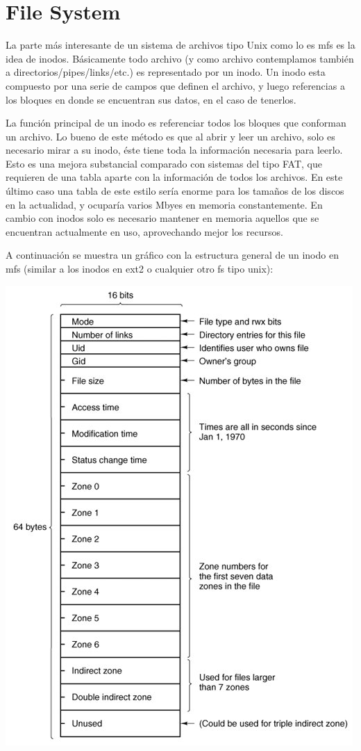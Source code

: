 \section{File System}

La parte más interesante de un sistema de archivos tipo Unix como lo es mfs es
la idea de inodos. Básicamente todo archivo (y como archivo contemplamos también
a directorios/pipes/links/etc.) es representado por un inodo. Un inodo esta
compuesto por una serie de campos que definen el archivo, y luego referencias a
los bloques en donde se encuentran sus datos, en el caso de tenerlos.

La función principal de un inodo es referenciar todos los bloques que conforman
un archivo. Lo bueno de este método es que al abrir y leer un archivo, solo es
necesario mirar a su inodo, éste tiene toda la información necesaria para
leerlo. Esto es una mejora substancial comparado con sistemas del tipo FAT, que
requieren de una tabla aparte con la información de todos los archivos. En este
último caso una tabla de este estilo sería enorme para los tamaños de los discos
en la actualidad, y ocuparía varios Mbyes en memoria constantemente. En cambio
con inodos solo es necesario mantener en memoria aquellos que se encuentran
actualmente en uso, aprovechando mejor los recursos.

A continuación se muestra un gráfico con la estructura general de un inodo en
mfs (similar a los inodos en ext2 o cualquier otro fs tipo unix):

\begin{center}
\includegraphics[scale=0.5]{../img/inode.png}
\end{center}


